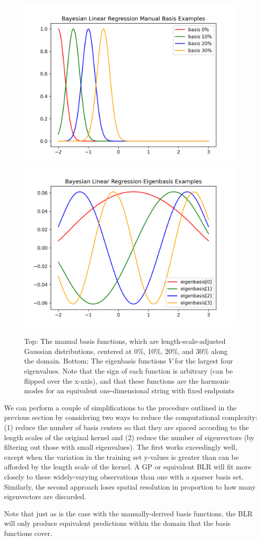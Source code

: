 \documentclass{article}
\begin{document}
\begin{figure}
    \begin{center}
    \includegraphics[width=0.75\linewidth]{manualbasis}
    \includegraphics[width=0.75\linewidth]{eigenbasis}
    \caption{Top: The manual basis functions, which are length-scale-adjusted Gaussian distributions, centered at 0\%, 10\%, 20\%, and 30\% along the domain. Bottom: The eigenbasis functions $V$ for the largest four eigenvalues. Note that the sign of each function is arbitrary (can be flipped over the x-axis), and that these functions are the harmonic modes for an equivalent one-dimensional string with fixed endpoints}
    \label{fig:basis}
    \end{center}
\end{figure}

We can perform a couple of simplifications to the procedure outlined in the previous section by considering two ways to reduce the computational complexity: (1) reduce the number of basis centers so that they are spaced according to the length scales of the original kernel and (2) reduce the number of eigenvectors (by filtering out those with small eigenvalues). The first works exceedingly well, except when the variation in the training set y-values is greater than can be afforded by the length scale of the kernel. A GP or equivalent BLR will fit more closely to these widely-varying observations than one with a sparser basis set. Similarly, the second approach loses spatial resolution in proportion to how many eigenvectors are discarded.

Note that just as is the case with the manually-derived basis functions, the BLR will only produce equivalent predictions within the domain that the basis functions cover.




\printbibliography
\end{document}
